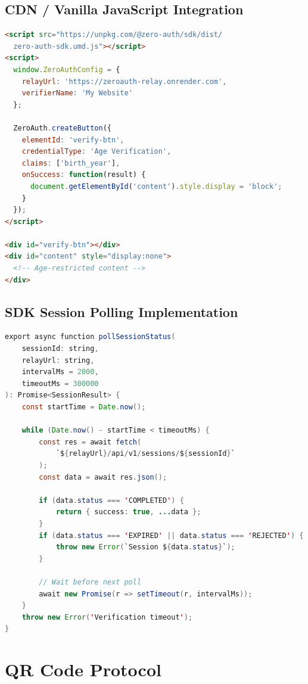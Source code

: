 \subsection{CDN / Vanilla JavaScript Integration}
\begin{lstlisting}[language=HTML, caption={CDN Integration}]
<script src="https://unpkg.com/@zero-auth/sdk/dist/
  zero-auth-sdk.umd.js"></script>
<script>
  window.ZeroAuthConfig = {
    relayUrl: 'https://zeroauth-relay.onrender.com',
    verifierName: 'My Website'
  };
  
  ZeroAuth.createButton({
    elementId: 'verify-btn',
    credentialType: 'Age Verification',
    claims: ['birth_year'],
    onSuccess: function(result) {
      document.getElementById('content').style.display = 'block';
    }
  });
</script>

<div id="verify-btn"></div>
<div id="content" style="display:none">
  <!-- Age-restricted content -->
</div>
\end{lstlisting}

\subsection{SDK Session Polling Implementation}

\begin{lstlisting}[language=Java, caption={Session Polling (sdk/polling.ts)}]
export async function pollSessionStatus(
    sessionId: string,
    relayUrl: string,
    intervalMs = 2000,
    timeoutMs = 300000
): Promise<SessionResult> {
    const startTime = Date.now();
    
    while (Date.now() - startTime < timeoutMs) {
        const res = await fetch(
            `${relayUrl}/api/v1/sessions/${sessionId}`
        );
        const data = await res.json();
        
        if (data.status === 'COMPLETED') {
            return { success: true, ...data };
        }
        if (data.status === 'EXPIRED' || data.status === 'REJECTED') {
            throw new Error(`Session ${data.status}`);
        }
        
        // Wait before next poll
        await new Promise(r => setTimeout(r, intervalMs));
    }
    throw new Error('Verification timeout');
}
\end{lstlisting}

\section{QR Code Protocol}

